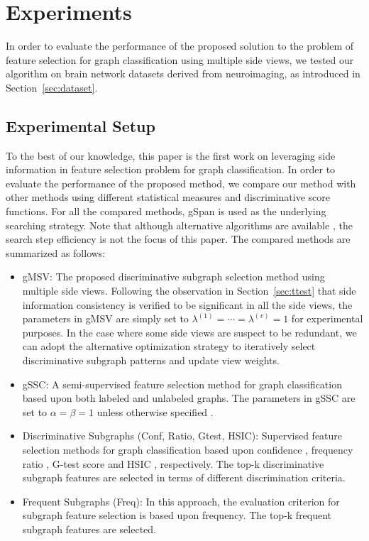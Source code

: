 \documentclass[conference]{IEEEtran}
\newcommand{\galgo}[0]{gMSV}
\newcommand{\gssc}[0]{gSSC}
\newcommand{\duga}[0]{Conf}
\newcommand{\dugb}[0]{Ratio}
\newcommand{\dugc}[0]{Gtest}
\newcommand{\dugd}[0]{HSIC}
\newcommand{\topk}[0]{Freq}
\begin{document}
\section{Experiments}\label{sec:exp}

In order to evaluate the performance of the proposed solution to the problem of feature selection for graph classification using multiple side views, we tested our algorithm on brain network datasets derived from neuroimaging, as introduced in Section~\ref{sec:dataset}.

\subsection{Experimental Setup}

To the best of our knowledge, this paper is the first work on leveraging side information in feature selection problem for graph classification. In order to evaluate the performance of the proposed method, we compare our method with other methods using different statistical measures and discriminative score functions. For all the compared methods, gSpan \cite{yan2002gspan} is used as the underlying searching strategy. Note that although alternative algorithms are available \cite{yan2008mining,jin2009graph,jin2010gaia}, the search step efficiency is not the focus of this paper. The compared methods are summarized as follows:
\begin{itemize}
\item {\galgo}: The proposed discriminative subgraph selection method using multiple side views. Following the observation in Section~\ref{sec:ttest} that side information consistency is verified to be significant in all the side views, the parameters in {\galgo} are simply set to $\lambda^{(1)}=\cdots=\lambda^{(v)}=1$ for experimental purposes. In the case where some side views are suspect to be redundant, we can adopt the alternative optimization strategy to iteratively select discriminative subgraph patterns and update view weights.
\item {\gssc}: A semi-supervised feature selection method for graph classification based upon both labeled and unlabeled graphs. The parameters in gSSC are set to $\alpha=\beta=1$ unless otherwise specified \cite{kong2010semi}.
\item Discriminative Subgraphs ({\duga}, {\dugb}, {\dugc}, {\dugd}): Supervised feature selection methods for graph classification based upon confidence \cite{gao2010direct}, frequency ratio \cite{jin2011lts,jin2010gaia,jin2009graph}, G-test score \cite{yan2008mining} and HSIC \cite{kong2010multi}, respectively. The top-k discriminative subgraph features are selected in terms of different discrimination criteria.
\item Frequent Subgraphs ({\topk}): In this approach, the evaluation criterion for subgraph feature selection is based upon frequency. The top-k frequent subgraph features are selected.
\end{itemize}
\end{document}
